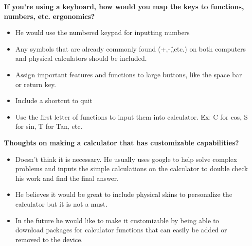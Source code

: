 \documentclass{article}
\begin{document}
\textbf{If you’re using a keyboard, how would you map the keys to functions, numbers, etc. ergonomics?}
\begin{itemize}
\itemsep0em 
\item He would use the numbered keypad for inputting numbers 
\item Any symbols that are already commonly found (+,-,\^,etc.) on both computers and physical calculators should be included.
\item Assign important features and functions to large buttons, like the space bar or return key.
\item Include a shortcut to quit
\item Use the first letter of functions to input them into calculator. Ex: C for cos, S for sin, T for Tan, etc.
\end{itemize}

\textbf{Thoughts on making a calculator that has customizable capabilities? }
\begin{itemize}
\itemsep0em 
\item Doesn’t think it is necessary. He usually uses google to help solve complex problems and inputs the simple calculations on the calculator to double check his work and find the final answer. 
\item He believes it would be great to include physical skins to personalize the calculator but it is not a must.
\item In the future he would like to make it customizable by being able to download packages for calculator functions that can easily be added or removed to the device.
\end{itemize}
\pagebreak
\end{document}
